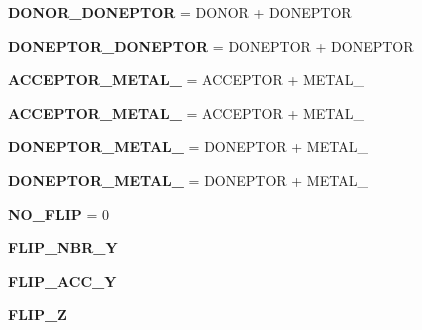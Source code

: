 \begin{CompactItemize}
\item 
\textbf{DONOR\_\-DONEPTOR} = DONOR + DONEPTOR\label{classSimSite3D_1_1HbondGeometry_c0cc28273dcab0f6d690a41ff295b4c7bfc921b96362e9a318e6ec9432caf620}

\item 
\textbf{DONEPTOR\_\-DONEPTOR} = DONEPTOR + DONEPTOR\label{classSimSite3D_1_1HbondGeometry_c0cc28273dcab0f6d690a41ff295b4c7b865650cd901b4ab0175655d807248e9}

\item 
\textbf{ACCEPTOR\_\-METAL\_} = ACCEPTOR + METAL\_\label{classSimSite3D_1_1HbondGeometry_c0cc28273dcab0f6d690a41ff295b4c7bca79ba395ce711d8aa3beccf90fc745}

\item 
\textbf{ACCEPTOR\_\-METAL\_} = ACCEPTOR + METAL\_\label{classSimSite3D_1_1HbondGeometry_c0cc28273dcab0f6d690a41ff295b4c7e04071c71c857ba2eb586f73d9a94910}

\item 
\textbf{DONEPTOR\_\-METAL\_} = DONEPTOR + METAL\_\label{classSimSite3D_1_1HbondGeometry_c0cc28273dcab0f6d690a41ff295b4c7b5a26234ecac6d9aab327f65aeddfc8e}

\item 
\textbf{DONEPTOR\_\-METAL\_} = DONEPTOR + METAL\_\label{classSimSite3D_1_1HbondGeometry_c0cc28273dcab0f6d690a41ff295b4c70379a44a9e41c1028a840746708099d6}

\item 
\textbf{NO\_\-FLIP} = 0\label{classSimSite3D_1_1HbondGeometry_3050e159423a19503016965054e429e745e9128eb1c77dce6e3d7ec7dff9f60e}

\item 
\textbf{FLIP\_\-NBR\_\-Y}\label{classSimSite3D_1_1HbondGeometry_3050e159423a19503016965054e429e7c249ca22e8f59126719ec419d5480d2a}

\item 
\textbf{FLIP\_\-ACC\_\-Y}\label{classSimSite3D_1_1HbondGeometry_3050e159423a19503016965054e429e713b124e29dcd7cd9ddc701831191d17e}

\item 
\textbf{FLIP\_\-Z}\label{classSimSite3D_1_1HbondGeometry_3050e159423a19503016965054e429e7f2590814bca79e5321a0ad03611d35bc}


\end{CompactItemize}
